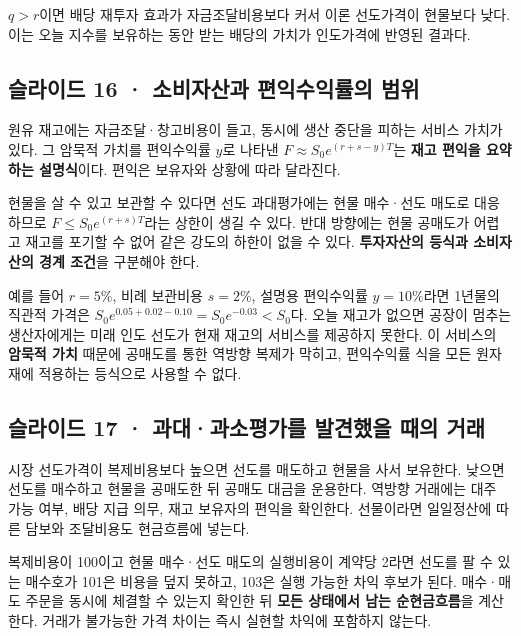 \documentclass[11pt,a4paper]{article}
\begin{document}
$q>r$이면 배당 재투자 효과가 자금조달비용보다 커서 이론 선도가격이 현물보다 낮다. 이는 오늘 지수를 보유하는 동안 받는 배당의 가치가 인도가격에 반영된 결과다.\par

\subsection{슬라이드 16 · 소비자산과 편익수익률의 범위}
원유 재고에는 자금조달·창고비용이 들고, 동시에 생산 중단을 피하는 서비스 가치가 있다. 그 암묵적 가치를 편익수익률 $y$로 나타낸 $F\approx S_0e^{(r+s-y)T}$는 \textbf{재고 편익을 요약하는 설명식}이다. 편익은 보유자와 상황에 따라 달라진다.\par

현물을 살 수 있고 보관할 수 있다면 선도 과대평가에는 현물 매수·선도 매도로 대응하므로 $F\leq S_0e^{(r+s)T}$라는 상한이 생길 수 있다. 반대 방향에는 현물 공매도가 어렵고 재고를 포기할 수 없어 같은 강도의 하한이 없을 수 있다. \textbf{투자자산의 등식과 소비자산의 경계 조건}을 구분해야 한다.\par

예를 들어 $r=5\%$, 비례 보관비용 $s=2\%$, 설명용 편익수익률 $y=10\%$라면 1년물의 직관적 가격은 $S_0e^{0.05+0.02-0.10}=S_0e^{-0.03}<S_0$다. 오늘 재고가 없으면 공장이 멈추는 생산자에게는 미래 인도 선도가 현재 재고의 서비스를 제공하지 못한다. 이 서비스의 \textbf{암묵적 가치} 때문에 공매도를 통한 역방향 복제가 막히고, 편익수익률 식을 모든 원자재에 적용하는 등식으로 사용할 수 없다.\par

\subsection{슬라이드 17 · 과대·과소평가를 발견했을 때의 거래}
시장 선도가격이 복제비용보다 높으면 선도를 매도하고 현물을 사서 보유한다. 낮으면 선도를 매수하고 현물을 공매도한 뒤 공매도 대금을 운용한다. 역방향 거래에는 대주 가능 여부, 배당 지급 의무, 재고 보유자의 편익을 확인한다. 선물이라면 일일정산에 따른 담보와 조달비용도 현금흐름에 넣는다.\par

복제비용이 100이고 현물 매수·선도 매도의 실행비용이 계약당 2라면 선도를 팔 수 있는 매수호가 101은 비용을 덮지 못하고, 103은 실행 가능한 차익 후보가 된다. 매수·매도 주문을 동시에 체결할 수 있는지 확인한 뒤 \textbf{모든 상태에서 남는 순현금흐름}을 계산한다. 거래가 불가능한 가격 차이는 즉시 실현할 차익에 포함하지 않는다.\par
\end{document}
